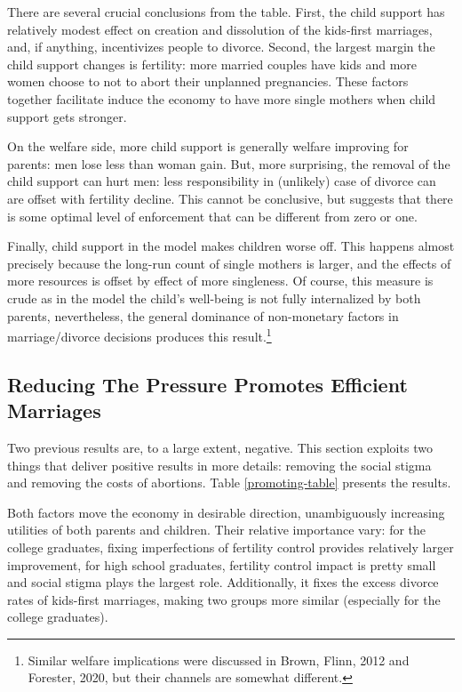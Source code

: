 \documentclass[12pt,letter]{article}
\begin{document}
There are several crucial conclusions from the table. First, the child support has relatively modest effect on creation and dissolution of the kids-first marriages, and, if anything, incentivizes people to divorce. Second, the largest margin the child support changes is fertility: more married couples have kids and more women choose to not to abort their unplanned pregnancies. These factors together facilitate induce the economy to have more single mothers when child support gets stronger.

On the welfare side, more child support is generally welfare improving for parents: men lose less than woman gain. But, more surprising, the removal of the child support can hurt men: less responsibility in (unlikely) case of divorce can are offset with fertility decline. This cannot be conclusive, but suggests that there is some optimal level of enforcement that can be different from zero or one. 

Finally, child support in the model makes children worse off. This happens almost precisely because the long-run count of single mothers is larger, and the effects of more resources is offset by effect of more singleness. Of course, this measure is crude as in the model the child's well-being is not fully internalized by both parents, nevertheless, the general dominance of non-monetary factors in marriage/divorce decisions produces this result.\footnote{Similar welfare implications were discussed in Brown, Flinn, 2012 and Forester, 2020, but their channels are somewhat different.}



\subsection{Reducing The Pressure Promotes Efficient Marriages}

Two previous results are, to a large extent, negative. This section exploits two things that deliver positive results in more details: removing the social stigma and removing the costs of abortions. Table \ref{promoting-table} presents the results.

Both factors move the economy in desirable direction, unambiguously increasing utilities of both parents and children. Their relative importance vary: for the college graduates, fixing imperfections of fertility control provides relatively larger improvement, for high school graduates, fertility control impact is pretty small and social stigma plays the largest role. Additionally, it fixes the excess divorce rates of kids-first marriages, making two groups more similar (especially for the college graduates). 
\end{document}
